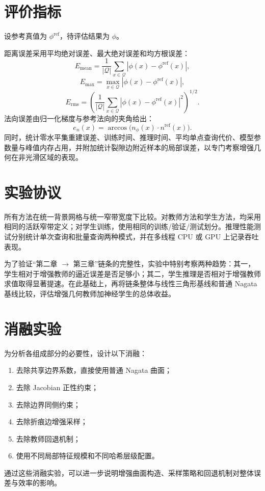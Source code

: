 \documentclass[12pt,oneside]{ctexbook}
\begin{document}
\section{评价指标}
设参考真值为 $\phi^{\mathrm{ref}}$，待评估结果为 $\phi$。

距离误差采用平均绝对误差、最大绝对误差和均方根误差：
\[
E_{\mathrm{mean}}=\frac{1}{|\mathcal Q|}\sum_{x\in\mathcal Q}|\phi(x)-\phi^{\mathrm{ref}}(x)|,
\]
\[
E_{\max}=\max_{x\in\mathcal Q}|\phi(x)-\phi^{\mathrm{ref}}(x)|,
\]
\[
E_{\mathrm{rms}}=\left(\frac{1}{|\mathcal Q|}\sum_{x\in\mathcal Q}|\phi(x)-\phi^{\mathrm{ref}}(x)|^2\right)^{1/2}.
\]
法向误差由归一化梯度与参考法向的夹角给出：
\[
e_n(x)=\arccos\big(n_\phi(x)\cdot n^{\mathrm{ref}}(x)\big).
\]
同时，统计零水平集重建误差、训练时间、推理时间、平均单点查询代价、模型参数量与峰值内存占用，并附加统计裂隙边附近样本的局部误差，以专门考察增强几何在非光滑区域的表现。

\section{实验协议}
所有方法在统一背景网格与统一窄带宽度下比较。对教师方法和学生方法，均采用相同的活跃窄带定义；对学生训练，使用相同的训练/验证/测试划分。推理性能测试分别统计单次查询和批量查询两种模式，并在多线程 CPU 或 GPU 上记录吞吐表现。

为了验证“第二章 $\rightarrow$ 第三章”链条的完整性，实验中特别考察两种趋势：其一，学生相对于增强教师的逼近误差是否足够小；其二，学生推理是否相对于增强教师求值取得显著提速。在此基础上，再将链条整体与线性三角形基线和普通 Nagata 基线比较，评估增强几何教师加神经学生的总体收益。

\section{消融实验}
为分析各组成部分的必要性，设计以下消融：
\begin{enumerate}[label=\arabic*)]
  \item 去除共享边界系数，直接使用普通 Nagata 曲面；
  \item 去除 Jacobian 正性约束；
  \item 去除边界同侧约束；
  \item 去除折痕边增强采样；
  \item 去除教师回退机制；
  \item 使用不同局部特征规模和不同哈希层级配置。
\end{enumerate}
通过这些消融实验，可以进一步说明增强曲面构造、采样策略和回退机制对整体误差与效率的影响。
\end{document}
